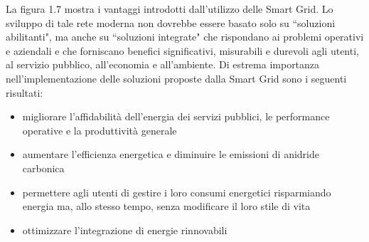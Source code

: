 \begin{figure}[h]
\end{figure}

La figura 1.7 mostra i vantaggi introdotti dall'utilizzo delle Smart Grid. Lo sviluppo di tale rete moderna non dovrebbe essere basato solo su ``soluzioni abilitanti", ma anche su ``soluzioni integrate" che rispondano ai problemi operativi e aziendali e che forniscano benefici significativi, misurabili e durevoli agli utenti, al servizio pubblico, all'economia e all'ambiente.
\newline 
Di estrema importanza nell'implementazione delle soluzioni proposte dalla Smart Grid sono i seguenti risultati:
\begin{itemize}
\item migliorare l'affidabilità dell'energia dei servizi pubblici, le performance operative e la produttività generale
\item aumentare l'efficienza energetica e diminuire le emissioni di anidride carbonica
\item permettere agli utenti di gestire i loro consumi energetici risparmiando energia ma, allo stesso tempo, senza modificare il loro stile di vita
\item ottimizzare l'integrazione di energie rinnovabili 
\end{itemize}

